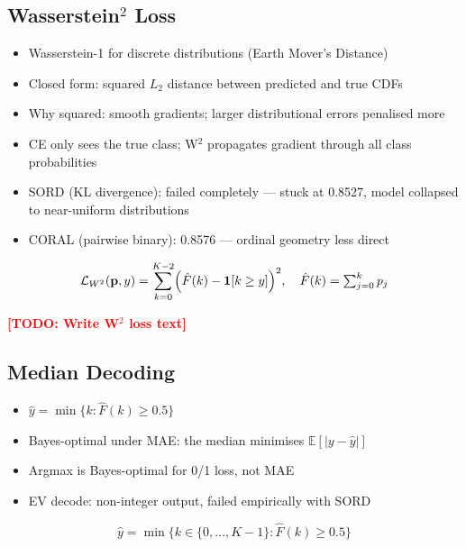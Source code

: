 \documentclass{article}
\newcommand{\TODO}[1]{\textcolor{red}{\textbf{[TODO: #1]}}}
\begin{document}
\subsection{Wasserstein$^2$ Loss}
\label{sec:emd}

\begin{itemize}[leftmargin=*,itemsep=1pt]
  \item Wasserstein-1 for discrete distributions (Earth Mover's Distance)
  \item Closed form: squared $L_2$ distance between predicted and true CDFs
  \item Why squared: smooth gradients; larger distributional errors penalised more
  \item CE only sees the true class; W$^2$ propagates gradient through all
        class probabilities
  \item SORD (KL divergence): failed completely --- stuck at 0.8527,
        model collapsed to near-uniform distributions
  \item CORAL (pairwise binary): 0.8576 --- ordinal geometry less direct
\end{itemize}

\begin{equation}
  \mathcal{L}_{W^2}(\mathbf{p}, y)
  = \sum_{k=0}^{K-2} \Bigl(\hat{F}(k) - \mathbf{1}[k \geq y]\Bigr)^{2},
  \quad \hat{F}(k) = \textstyle\sum_{j=0}^{k} p_j
  \label{eq:w2}
\end{equation}

\TODO{Write W$^2$ loss text}

\subsection{Median Decoding}

\begin{itemize}[leftmargin=*,itemsep=1pt]
  \item $\hat{y} = \min\{k : \hat{F}(k) \geq 0.5\}$
  \item Bayes-optimal under MAE: the median minimises
        $\mathbb{E}[|y - \hat{y}|]$
  \item Argmax is Bayes-optimal for 0/1 loss, not MAE
  \item EV decode: non-integer output, failed empirically with SORD
\end{itemize}

\begin{equation}
  \hat{y} = \min\bigl\{k \in \{0,\ldots,K{-}1\} : \hat{F}(k) \geq 0.5\bigr\}
  \label{eq:median}
\end{equation}
\end{document}
